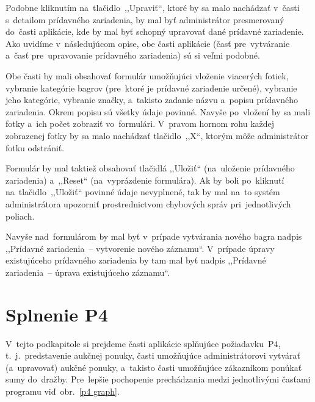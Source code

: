 Podobne kliknutím na~tlačidlo~,,Upraviť``, ktoré by sa malo nachádzať v~časti s~detailom prídavného zariadenia, by mal byť administrátor presmerovaný do~časti aplikácie, kde by mal byť schopný upravovať dané prídavné zariadenie. Ako uvidíme v~následujúcom opise, obe časti aplikácie (časť pre~vytváranie a~časť pre~upravovanie prídavného zariadenia) sú si veľmi podobné.

Obe časti by mali obsahovať formulár umožňujúci vloženie viacerých fotiek, vybranie kategórie bagrov (pre~ktoré je prídavné zariadenie určené), vybranie jeho kategórie, vybranie značky, a~takisto zadanie názvu a~popisu prídavného zariadenia. Okrem popisu sú všetky údaje povinné. Navyše po~vložení by sa mali fotky a~ich počet zobraziť vo~formulári. V~pravom hornom rohu každej zobrazenej fotky by sa malo nachádzať tlačidlo~,,X``, ktorým môže administrátor fotku odstrániť.

Formulár by mal taktiež obsahovať tlačidlá ,,Uložiť`` (na~uloženie prídavného zariadenia) a~,,Reset`` (na~vyprázdenie formulára). Ak by boli po~kliknutí na~tlačidlo~,,Uložiť`` povinné údaje nevyplnené, tak by mal na~to systém administrátora upozorniť prostrednictvom chybových správ pri~jednotlivých poliach.

Navyše nad~formulárom by mal byť v~prípade vytvárania nového bagra nadpis ,,Prídavné zariadenia~-- vytvorenie nového záznamu``. V~prípade úpravy existujúceho prídavného zariadenia by tam mal byť nadpis ,,Prídavné zariadenia~-- úprava existujúceho záznamu``.

\section{Splnenie P4}

V~tejto podkapitole si prejdeme časti aplikácie splňujúce požiadavku~P4, t.~j.~predstavenie aukčnej ponuky, časti umožňujúce administrátorovi vytvárať (a~upravovať) aukčné ponuky, a~takisto časti umožňujúce zákazníkom ponúkať sumy do~dražby. Pre~lepšie pochopenie prechádzania medzi jednotlivými časťami programu viď~obr.~\ref{p4 graph}.

